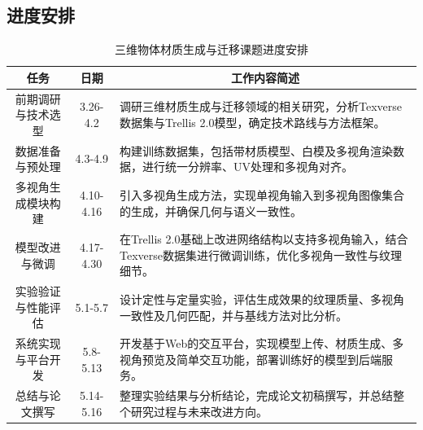 \subsection{进度安排}
\begin{table}[htbp]
\centering
\caption{三维物体材质生成与迁移课题进度安排}
\begin{tabularx}{\textwidth}{|c|c|X|}
\hline
任务 & 日期 & \multicolumn{1}{c|}{工作内容简述} \\
\hline
前期调研与技术选型 & 3.26-4.2 & 调研三维材质生成与迁移领域的相关研究，分析Texverse数据集与Trellis 2.0模型，确定技术路线与方法框架。 \\
\hline
数据准备与预处理 & 4.3-4.9 & 构建训练数据集，包括带材质模型、白模及多视角渲染数据，进行统一分辨率、UV处理和多视角对齐。 \\
\hline
多视角生成模块构建 & 4.10-4.16 & 引入多视角生成方法，实现单视角输入到多视角图像集合的生成，并确保几何与语义一致性。 \\
\hline
模型改进与微调 & 4.17-4.30 & 在Trellis 2.0基础上改进网络结构以支持多视角输入，结合Texverse数据集进行微调训练，优化多视角一致性与纹理细节。 \\
\hline
实验验证与性能评估 & 5.1-5.7 & 设计定性与定量实验，评估生成效果的纹理质量、多视角一致性及几何匹配，并与基线方法对比分析。 \\
\hline
系统实现与平台开发 & 5.8-5.13 & 开发基于Web的交互平台，实现模型上传、材质生成、多视角预览及简单交互功能，部署训练好的模型到后端服务。 \\
\hline
总结与论文撰写 & 5.14-5.16 & 整理实验结果与分析结论，完成论文初稿撰写，并总结整个研究过程与未来改进方向。 \\
\hline
\end{tabularx}
\end{table}
